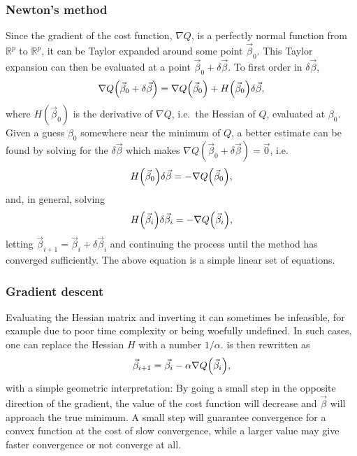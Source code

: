 \documentclass[11pt,british,a4paper]{article}
\numberwithin{equation}{section}
\begin{document}
\subsubsection{Newton's method}\label{subsubsec:newton}
Since the gradient of the cost function, \(\nabla Q\), is a perfectly normal function from \(\mathbb{R}^p\) to \(\mathbb{R}^p\), it can be Taylor expanded around some point \(\vec{\beta}_0\).
This Taylor expansion can then be evaluated at a point \(\vec{\beta}_0 + \delta\vec{\beta}\). To first order in \(\delta\vec{\beta}\),
\begin{equation}
    \nabla Q\qty(\vec{\beta}_0 + \delta\vec{\beta}) = \nabla Q\qty(\vec{\beta}_0) + H\qty(\vec{\beta}_0)\delta\vec{\beta},
\end{equation}
where \(H(\vec{\beta}_0)\) is the derivative of \(\nabla Q\), i.e.\ the Hessian of \(Q\), evaluated at \(\beta_0\).
Given a guess \(\beta_0\) somewhere near the minimum of \(Q\), a better estimate can be found by solving for the \(\delta\vec{\beta}\) which makes \(\nabla Q(\vec{\beta}_0 + \delta\vec{\beta}) = \vec{0}\), i.e.
\begin{equation}
    H\qty(\vec{\beta}_0)\delta\vec{\beta} = -\nabla Q\qty(\vec{\beta}_0),
\end{equation}
and, in general, solving
\begin{equation}
    H\qty(\vec{\beta}_i)\delta\vec{\beta}_i = -\nabla Q\qty(\vec{\beta}_i),\label{eq:newtonstep}
\end{equation}
letting \(\vec{\beta}_{i+1} = \vec{\beta}_i + \delta\vec{\beta}_i\) and continuing the process until the method has converged sufficiently.
The above equation is a simple linear set of equations.


\subsubsection{Gradient descent}
Evaluating the Hessian matrix and inverting it can sometimes be infeasible, for example due to poor time complexity or being woefully undefined.
In such cases, one can replace the Hessian \(H\) with a number \(1/\alpha\).
 is then rewritten as
\begin{equation}
    \vec{\beta}_{i+1} = \vec{\beta_i} - \alpha \nabla Q\qty(\vec{\beta}_i),
\end{equation}
with a simple geometric interpretation:
By going a small step in the opposite direction of the gradient, the value of the cost function will decrease and \(\vec{\beta}\) will approach the true minimum.
A small step will guarantee convergence for a convex function at the cost of slow convergence, while a larger value may give faster convergence or not converge at all.
\end{document}
